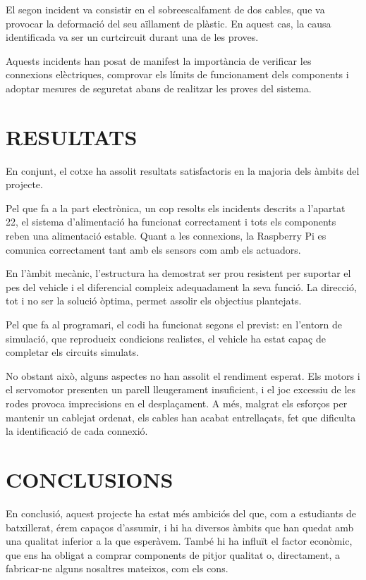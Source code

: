 \documentclass[11pt,a4paper]{article}
\let\origsection\section
\renewcommand{\section}{\clearpage\origsection}
\begin{document}
El segon incident va consistir en el sobreescalfament de dos cables, que va provocar la deformació del seu aïllament de plàstic. En aquest cas, la causa identificada va ser un curtcircuit durant una de les proves.

Aquests incidents han posat de manifest la importància de verificar les connexions elèctriques, comprovar els límits de funcionament dels components i adoptar mesures de seguretat abans de realitzar les proves del sistema.

\section{RESULTATS}

En conjunt, el cotxe ha assolit resultats satisfactoris en la majoria dels àmbits del projecte.

Pel que fa a la part electrònica, un cop resolts els incidents descrits a l’apartat 22, el sistema d’alimentació ha funcionat correctament i tots els components reben una alimentació estable. Quant a les connexions, la Raspberry Pi es comunica correctament tant amb els sensors com amb els actuadors.

En l’àmbit mecànic, l’estructura ha demostrat ser prou resistent per suportar el pes del vehicle i el diferencial compleix adequadament la seva funció. La direcció, tot i no ser la solució òptima, permet assolir els objectius plantejats.

Pel que fa al programari, el codi ha funcionat segons el previst: en l’entorn de simulació, que reprodueix condicions realistes, el vehicle ha estat capaç de completar els circuits simulats.

No obstant això, alguns aspectes no han assolit el rendiment esperat. Els motors i el servomotor presenten un parell lleugerament insuficient, i el joc excessiu de les rodes provoca imprecisions en el desplaçament. A més, malgrat els esforços per mantenir un cablejat ordenat, els cables han acabat entrellaçats, fet que dificulta la identificació de cada connexió.

\section{CONCLUSIONS}

En conclusió, aquest projecte ha estat més ambiciós del que, com a estudiants de batxillerat, érem capaços d’assumir, i hi ha diversos àmbits que han quedat amb una qualitat inferior a la que esperàvem. També hi ha influït el factor econòmic, que ens ha obligat a comprar components de pitjor qualitat o, directament, a fabricar-ne alguns nosaltres mateixos, com els cons.
\end{document}
